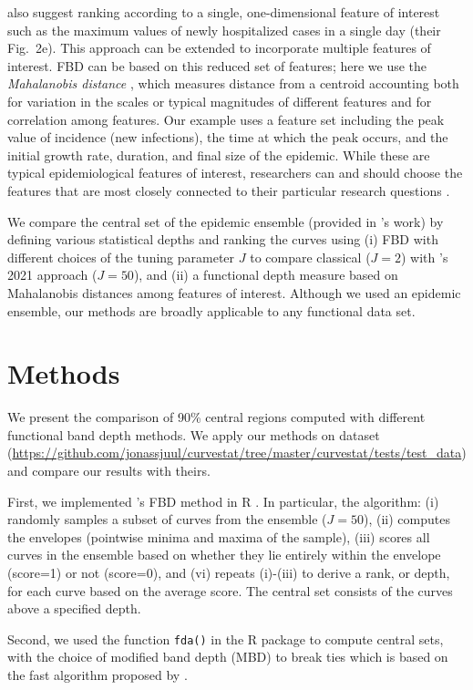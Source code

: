 \documentclass[fleqn,10pt,lineno]{wlpeerj}
\begin{document}
\juul also suggest ranking according to a single, one-dimensional feature of interest such as the maximum values of newly hospitalized cases in a single day (their Fig.~2e). This approach can be extended to incorporate multiple features of interest. FBD can be based on this reduced set of features; here we use the \emph{Mahalanobis distance} \citep{mahalanobis1936generalized}, which measures distance from a centroid accounting both for variation in the scales or typical magnitudes of different features and for correlation among features. Our example uses a feature set including the peak value of incidence (new infections), the time at which the peak occurs, and the initial growth rate, duration, and final size of the epidemic. While these are typical epidemiological features of interest, researchers can and should choose the features that are most closely connected to their particular research questions \citep{probert2016decision}.

We compare the central set of the epidemic ensemble (provided in \juul's work) by defining various statistical depths and ranking the curves using (i) FBD with different choices of the tuning parameter $J$ to compare classical ($J=2$) with \juul's 2021 approach ($J=50$), and (ii) a functional depth measure based on Mahalanobis distances among features of interest.
Although we used an epidemic ensemble, our methods are broadly applicable to any functional data set.

\section*{Methods}

We present the comparison of 90\% central regions computed with different functional band depth methods. We apply our methods on \juul dataset (\url{https://github.com/jonassjuul/curvestat/tree/master/curvestat/tests/test_data}) and compare our results with theirs.

First, we implemented \juul's FBD method in R \citep{R}. In particular, the algorithm: (i) randomly samples a subset of curves from the ensemble ($J=50$), (ii) computes the envelopes (pointwise minima and maxima of the sample), (iii) scores all curves in the ensemble based on whether they lie entirely within the envelope (score=1) or not (score=0), and (vi) repeats (i)-(iii) to derive a rank, or depth, for each curve based on the average score. The central set consists of the curves above a specified depth.

Second, we used the function {\tt fda()} in the R package  \citep{roahd} to compute central sets, with the choice of modified band depth (MBD) to break ties which is based on the fast algorithm proposed by \cite{sun2012exact}.
\end{document}
